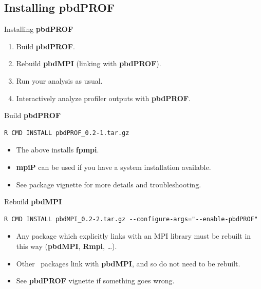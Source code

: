 \subsection{Installing pbdPROF}

\begin{frame}
  \begin{block}{Installing \textbf{pbdPROF}}
    \begin{enumerate}
      \item Build \textbf{pbdPROF}.
      \item Rebuild \textbf{pbdMPI} (linking with \textbf{pbdPROF}).
	  \item Run your analysis as usual.
	  \item Interactively analyze profiler outputs with \textbf{pbdPROF}.
    \end{enumerate}
  \end{block}
\end{frame}


\begin{frame}[fragile]
  \begin{block}{Build \textbf{pbdPROF}}
\begin{lstlisting}[language=shl,title=\ ]
R CMD INSTALL pbdPROF_0.2-1.tar.gz
\end{lstlisting}
    \begin{itemize}
      \item The above installs \textbf{fpmpi}.
      \item \textbf{mpiP} can be used if you have a system installation available.
      \item See package vignette for more details and troubleshooting.
    \end{itemize}
  \end{block}
\end{frame}



\begin{frame}[fragile]
  \begin{block}{Rebuild \textbf{pbdMPI}}
\begin{lstlisting}[language=shl,title=\ ]
R CMD INSTALL pbdMPI_0.2-2.tar.gz --configure-args="--enable-pbdPROF"
\end{lstlisting}
    \begin{itemize}
      \item Any package which explicitly links with an MPI library must be rebuilt in this way 
(\textbf{pbdMPI}, \textbf{Rmpi}, \dots).
	  \item Other \pbdR\ packages link with \textbf{pbdMPI}, and so do not need to be rebuilt.
      \item See \textbf{pbdPROF} vignette if something goes wrong.
    \end{itemize}
  \end{block}
\end{frame}

